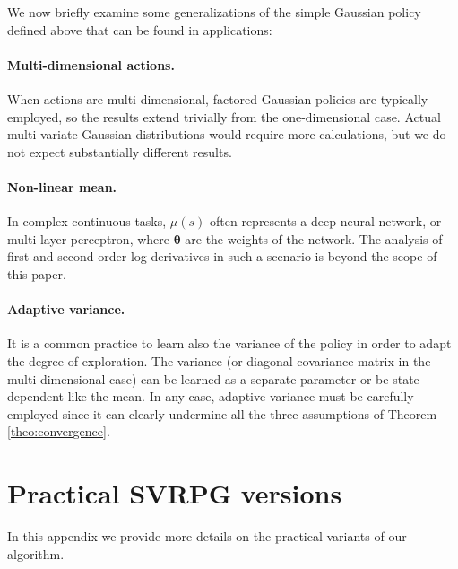 \documentclass{article}
\theoremstyle{remark}
\theoremstyle{definition}
\newcommand{\vtheta}{\boldsymbol{\theta}}
\begin{document}
We now briefly examine some generalizations of the simple Gaussian policy defined above that can be found in applications:

\paragraph{Multi-dimensional actions.}
When actions are multi-dimensional, factored Gaussian policies are typically employed, so the results extend trivially from the one-dimensional case. Actual multi-variate Gaussian distributions would require more calculations, but we do not expect substantially different results.

\paragraph{Non-linear mean.}
In complex continuous tasks, $\mu(s)$ often represents a deep neural network, or multi-layer perceptron, where $\vtheta$ are the weights of the network. The analysis of first and second order log-derivatives in such a scenario is beyond the scope of this paper.

\paragraph{Adaptive variance.}
It is a common practice to learn also the variance of the policy in order to adapt the degree of exploration. The variance (or diagonal covariance matrix in the multi-dimensional case) can be learned as a separate parameter or be state-dependent like the mean. In any case, adaptive variance must be carefully employed since it can clearly undermine all the three assumptions of Theorem \ref{theo:convergence}.

\section{Practical SVRPG versions}\label{app:practicalsvrpg}
In this appendix we provide more details on the practical variants of our algorithm.
\end{document}
